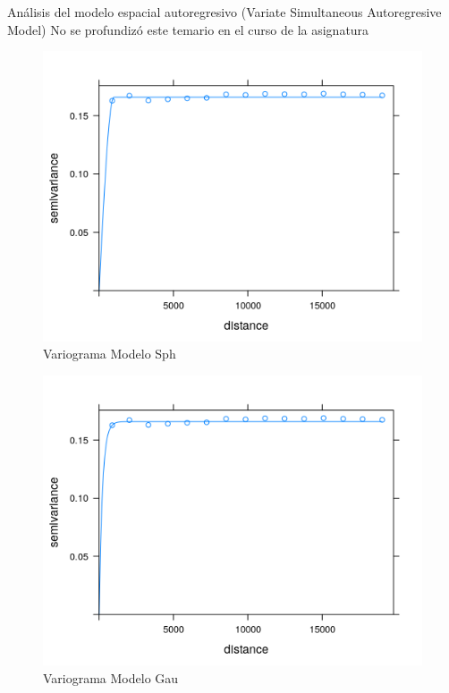 \documentclass[11pt,]{article}
\begin{document}
Análisis del modelo espacial autoregresivo (Variate Simultaneous
Autoregresive Model) No se profundizó este temario en el curso de la
asignatura

\begin{figure}
\centering
\includegraphics{Imagenes/semivarianzaMSph.png}
\caption{Variograma Modelo Sph}
\end{figure}

\begin{figure}
\centering
\includegraphics{Imagenes/SemivModelGau.png}
\caption{Variograma Modelo Gau}
\end{figure}
\end{document}
